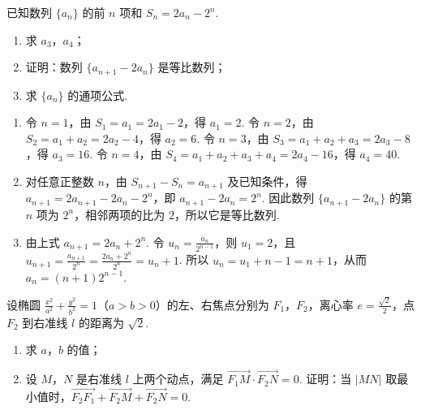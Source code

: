 \begin{problem}
已知数列 \(\{a_{n}\}\) 的前 \(n\) 项和 \(S_{n} = 2a_{n} - 2^{n}\).

\begin{enumerate}
\item 求 \(a_{3}\)，\(a_{4}\)；
\item 证明：数列 \(\{a_{n+1} - 2a_{n}\}\) 是等比数列；
\item 求 \(\{a_{n}\}\) 的通项公式.
\end{enumerate}
\end{problem}

\begin{solution}
\begin{enumerate}
\item 令 \(n=1\)，由 \(S_{1}=a_{1}=2a_{1}-2\)，得 \(a_{1}=2\). 令 \(n=2\)，由 \(S_{2}=a_{1}+a_{2}=2a_{2}-4\)，得 \(a_{2}=6\). 令 \(n=3\)，由 \(S_{3}=a_{1}+a_{2}+a_{3}=2a_{3}-8\)，得 \(a_{3}=16\). 令 \(n=4\)，由 \(S_{4}=a_{1}+a_{2}+a_{3}+a_{4}=2a_{4}-16\)，得 \(a_{4}=40\).
\item 对任意正整数 \(n\)，由 \(S_{n+1}-S_{n}=a_{n+1}\) 及已知条件，得 \(a_{n+1}=2a_{n+1}-2a_{n}-2^{n}\)，即 \(a_{n+1}-2a_{n}=2^{n}\). 因此数列 \(\{a_{n+1}-2a_{n}\}\) 的第 \(n\) 项为 \(2^{n}\)，相邻两项的比为 \(2\)，所以它是等比数列.
\item 由上式 \(a_{n+1}=2a_{n}+2^{n}\). 令 \(u_{n}=\frac{a_{n}}{2^{n-1}}\)，则 \(u_{1}=2\)，且 \(u_{n+1}=\frac{a_{n+1}}{2^{n}}=\frac{2a_{n}+2^{n}}{2^{n}}=u_{n}+1\). 所以 \(u_{n}=u_{1}+n-1=n+1\)，从而 \(a_{n}=(n+1)2^{n-1}\).
\end{enumerate}
\end{solution}

\begin{problem}
设椭圆 \(\frac{x^{2}}{a^{2}} + \frac{y^{2}}{b^{2}} = 1\)（\(a > b > 0\)）的左、右焦点分别为 \(F_{1}\)，\(F_{2}\)，离心率 \(e = \frac{\sqrt{2}}{2}\)，点 \(F_{2}\) 到右准线 \(l\) 的距离为 \(\sqrt{2}\).

\begin{enumerate}
\item 求 \(a\)，\(b\) 的值；
\item 设 \(M\)，\(N\) 是右准线 \(l\) 上两个动点，满足 \(\overrightarrow{F_{1}M} \cdot \overrightarrow{F_{2}N} = 0\). 证明：当 \(|MN|\) 取最小值时，\(\overrightarrow{F_{2}F_{1}} + \overrightarrow{F_{2}M} + \overrightarrow{F_{2}N} = 0\).
\end{enumerate}
\end{problem}

